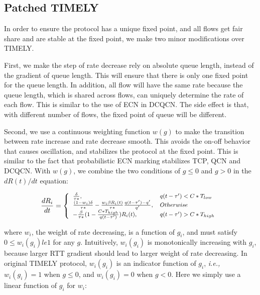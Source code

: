 \subsection {Patched TIMELY}


In order to ensure the protocol has a unique fixed point, and all flows get fair share and are stable at the fixed point,
we make two minor modifications over TIMELY.

First, we make the step of rate decrease rely on absolute queue length, instead of the gradient of queue length. 
This will ensure that there is only one fixed point for the queue length. In addition, all flow will have the same rate 
because the queue length, which is shared across flows, can uniquely determine the rate of each flow. This is 
similar to the use of ECN in DCQCN. The side effect is that, with different number of flows, the fixed point of 
queue will be different.

Second, we use a continuous weighting function $w(g)$ to make the transition between rate increase and rate decrease
smooth. This avoids the on-off behavior that causes oscillation, and stabilizes the protocol at the fixed point. 
This is similar to the fact that probabilistic ECN marking stabilizes TCP, QCN and DCQCN. With $w(g)$, we combine 
the two conditions of $g \le 0$ and $g>0$ in the $dR(t)/dt$ equation:


\begin{equation}
\small
\frac{{dR_i}}{{dt}} = \left\{ \begin{array}{ll}
\frac{\delta }{{\tau *}}, & q(t - \tau ') < C*{T_{low}}\\
\frac{{(1 - {w_i})\delta }}{{\tau *}} - \frac{{{w_i}\beta {R_i}(t)}}{{\tau *}}\frac{{q(t - \tau ') - q'}}{{q'}}, & Otherwise\\
 - \frac{\beta }{{\tau *}}(1 - \frac{{C*{T_{high}}}}{{q(t - \tau ')}})R_i(t), & q(t - \tau ') > C*{T_{high}}
\end{array} \right.\\
\label{eq:timely_fixed}
\end{equation}

where $w_i$, the weight of rate decreasing, is a function of $g_i$, and must satisfy $0 \le w_i(g_i) le 1$ for any $g$. 
Intuitively, $w_i(g_i)$ is monotonically increasing with $g_i$, because larger RTT gradient should lead to larger 
weight of rate decreasing. In original TIMELY protocol, $w_i(g_i)$ is an indicator function of $g_i$, {\em i.e.,} 
$w_i(g_i)=1$ when $g \le 0$, and $w_i(g_i)=0$ when $g<0$. Here we simply use a linear function of $g_i$ for $w_i$:

